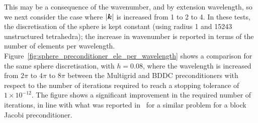 \documentclass[a4paper,12]{elsarticle}
\theoremstyle{definition}
\renewcommand{\vec}[1]{\mbox{\boldmath$#1$}}
\begin{document}
This may be a consequence of the wavenumber, and by extension wavelength, so we next consider the case where $|\vec{k}|$ is increased from 1 to 2 to 4. In these tests, the discretisation of the sphere is kept constant (using radius 1 and 15243 unstructured tetrahedra); the increase in wavenumber is reported in terms of the number of elements per wavelength.
Figure~\ref{fig:sphere_preconditioner_ele_per_wavelength} shows a comparison for the same sphere discretisation, with $h=0.08$, where the wavelength is increased from $2\pi$ to $4\pi$ to $8\pi$ between the Multigrid and BDDC preconditioners with respect to the number of iterations required to reach a stopping tolerance of $1\times 10^{-12}$. The figure shows a significant improvement in the required number of iterations, in line with what was reported in~\cite{Ledger2009} for a similar problem for a block Jacobi preconditioner.
\end{document}
